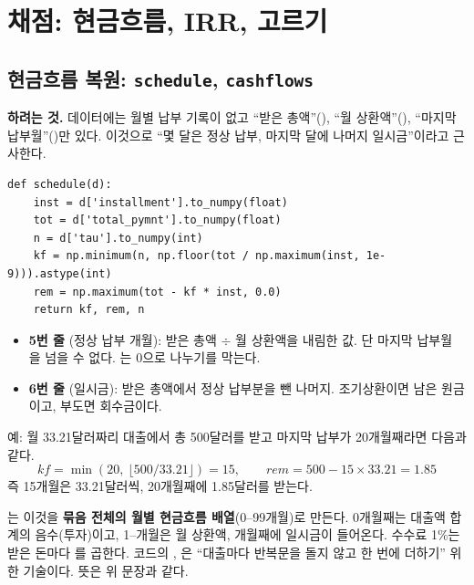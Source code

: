 \chapter{채점: 현금흐름, IRR, 고르기}

\section{현금흐름 복원: \texttt{schedule}, \texttt{cashflows}}
\textbf{하려는 것.} 데이터에는 월별 납부 기록이 없고 ``받은 총액''(), ``월 상환액''(), ``마지막 납부월''()만 있다. 이것으로 ``몇 달은 정상 납부, 마지막 달에 나머지 일시금''이라고 근사한다.
\begin{lstlisting}
def schedule(d):
    inst = d['installment'].to_numpy(float)
    tot = d['total_pymnt'].to_numpy(float)
    n = d['tau'].to_numpy(int)
    kf = np.minimum(n, np.floor(tot / np.maximum(inst, 1e-9))).astype(int)
    rem = np.maximum(tot - kf * inst, 0.0)
    return kf, rem, n
\end{lstlisting}
\begin{itemize}[leftmargin=*]
\item \textbf{5번 줄} (정상 납부 개월): 받은 총액 \ensuremath{\div} 월 상환액을 내림한 값. 단 마지막 납부월 을 넘을 수 없다. 는 0으로 나누기를 막는다.
\item \textbf{6번 줄} (일시금): 받은 총액에서 정상 납부분을 뺀 나머지. 조기상환이면 남은 원금이고, 부도면 회수금이다.
\end{itemize}
예: 월 33.21달러짜리 대출에서 총 500달러를 받고 마지막 납부가 20개월째라면 다음과 같다.
\[ kf=\min(20,\ \lfloor 500/33.21\rfloor)=15,\qquad rem=500-15\times33.21=1.85 \]
즉 15개월은 33.21달러씩, 20개월째에 1.85달러를 받는다.

는 이것을 \textbf{묶음 전체의 월별 현금흐름 배열}(0--99개월)로 만든다. 0개월째는 대출액 합계의 음수(투자)이고, 1--개월은 월 상환액, 개월째에 일시금이 들어온다. 수수료 1\%는 받은 돈마다 를 곱한다. 코드의 , 은 ``대출마다 반복문을 돌지 않고 한 번에 더하기'' 위한 기술이다. 뜻은 위 문장과 같다.

